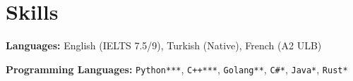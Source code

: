 \section{Skills}

\begin{onecolentry}
    \textbf{Languages:} English (IELTS 7.5/9), Turkish (Native), French (A2 ULB) 
\end{onecolentry}

\vspace{\betweenentryspace}

\begin{onecolentry}
    \textbf{Programming Languages:} \verb|Python***|, \verb|C++***|, \verb|Golang**|, \verb|C#*|, \verb|Java*|, \verb|Rust*|
\end{onecolentry}


\vspace{\betweenentryspace}

